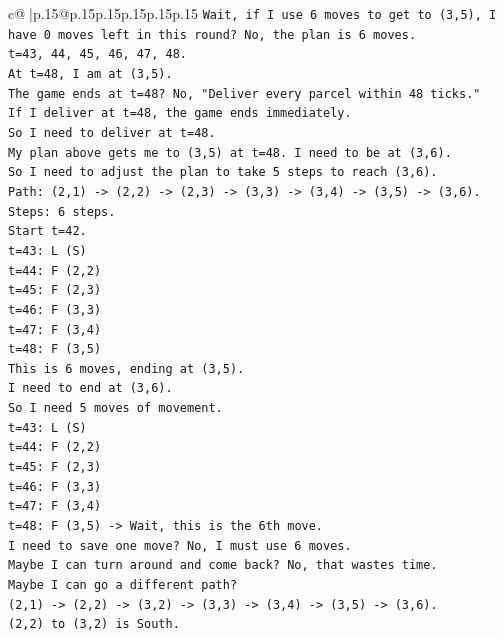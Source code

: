 \documentclass{article}
\begin{document}
{\begin{supertabular}{c@{$\;$}|p{.15\linewidth}@{}p{.15\linewidth}p{.15\linewidth}p{.15\linewidth}p{.15\linewidth}p{.15\linewidth}}
{{{\texttt{Wait, if I use 6 moves to get to (3,5), I have 0 moves left in this round? No, the plan is 6 moves.} \\
\texttt{t=43, 44, 45, 46, 47, 48.} \\
\texttt{At t=48, I am at (3,5).} \\
\texttt{The game ends at t=48? No, "Deliver every parcel within 48 ticks."} \\
\texttt{If I deliver at t=48, the game ends immediately.} \\
\texttt{So I need to deliver at t=48.} \\
\texttt{My plan above gets me to (3,5) at t=48. I need to be at (3,6).} \\
\texttt{So I need to adjust the plan to take 5 steps to reach (3,6).} \\
\texttt{Path: (2,1) {-}> (2,2) {-}> (2,3) {-}> (3,3) {-}> (3,4) {-}> (3,5) {-}> (3,6).} \\
\texttt{Steps: 6 steps.} \\
\texttt{Start t=42.} \\
\texttt{t=43: L (S)} \\
\texttt{t=44: F (2,2)} \\
\texttt{t=45: F (2,3)} \\
\texttt{t=46: F (3,3)} \\
\texttt{t=47: F (3,4)} \\
\texttt{t=48: F (3,5)} \\
\texttt{This is 6 moves, ending at (3,5).} \\
\texttt{I need to end at (3,6).} \\
\texttt{So I need 5 moves of movement.} \\
\texttt{t=43: L (S)} \\
\texttt{t=44: F (2,2)} \\
\texttt{t=45: F (2,3)} \\
\texttt{t=46: F (3,3)} \\
\texttt{t=47: F (3,4)} \\
\texttt{t=48: F (3,5) {-}> Wait, this is the 6th move.} \\
\texttt{I need to save one move? No, I must use 6 moves.} \\
\texttt{Maybe I can turn around and come back? No, that wastes time.} \\
\texttt{Maybe I can go a different path?} \\
\texttt{(2,1) {-}> (2,2) {-}> (3,2) {-}> (3,3) {-}> (3,4) {-}> (3,5) {-}> (3,6).} \\
\texttt{(2,2) to (3,2) is South.} \\
}}}
\end{supertabular}}
\end{document}
